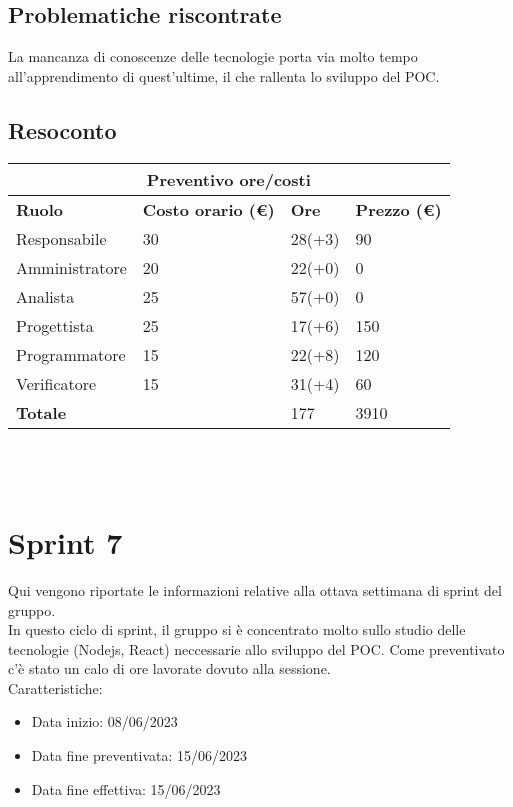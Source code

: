 \documentclass[12pt]{article}
\begin{document}
\subsection{Problematiche riscontrate}
La mancanza di conoscenze delle tecnologie porta via molto tempo all'apprendimento di quest'ultime, il che rallenta lo sviluppo del POC.
\subsection{Resoconto}
\begin{center}
    \begin{tabularx}{\textwidth}{|X|X|X|X|}
        \hline
        \multicolumn{4}{|c|}{\textbf{Preventivo ore/costi}}\\
        \hline
        \hline
        \textbf{Ruolo} & \textbf{Costo orario (\euro)} & \textbf{Ore} & \textbf{Prezzo (\euro)}\\
        \hline
        Responsabile    & 30 & 28(+3)  & 90\\
        \hline
        Amministratore  & 20 & 22(+0)  & 0\\
        \hline
        Analista        & 25 & 57(+0)  & 0\\
        \hline
        Progettista     & 25 & 17(+6)  & 150\\
        \hline
        Programmatore   & 15 & 22(+8)  & 120\\
        \hline
        Verificatore    & 15 & 31(+4)  & 60\\
        \hline
        \hline
        \textbf{Totale} &    & 177 &  3910 \\
        \hline
    \end{tabularx}\\[8pt]
    \mbox{}\\
\end{center}

\section{Sprint 7}
Qui vengono riportate le informazioni relative alla ottava settimana di sprint del gruppo. \\
In questo ciclo di sprint, il gruppo si è concentrato molto sullo studio delle tecnologie (Nodejs, React) neccessarie allo sviluppo del POC. Come preventivato c'è stato un calo di ore lavorate dovuto alla sessione.\\


Caratteristiche:
\begin{itemize}
    \item Data inizio: 08/06/2023
    \item Data fine preventivata: 15/06/2023
    \item Data fine effettiva: 15/06/2023
\end{itemize}
\end{document}
